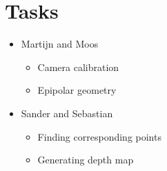 \documentclass[a4paper]{article}
\begin{document}
\section{Tasks}
  \begin{itemize}
    \item Martijn and Moos
    \begin{itemize}
      \item Camera calibration
      \item Epipolar geometry
    \end{itemize}
    \item Sander and Sebastian
    \begin{itemize}
      \item Finding corresponding points
      \item Generating depth map
    \end{itemize}
  \end{itemize}

 
\end{document}
